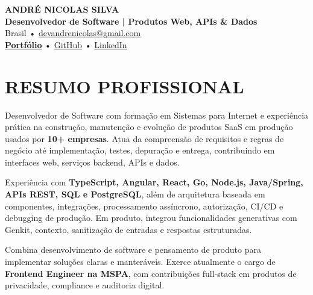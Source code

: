 \documentclass[10pt,a4paper]{article}
\begin{document}

\begin{center}

    {\LARGE \textbf{ANDRÉ NICOLAS SILVA}} \\[-2pt]

    {\normalsize \textbf{Desenvolvedor de Software | Produtos Web, APIs \& Dados}} \\[1pt]

    \footnotesize
    Brasil \quad • \quad
    \href{mailto:devandrenicolas@gmail.com}{devandrenicolas@gmail.com} \\[-1pt]

    \textbf{\href{https://portfolio-andrenicolas.vercel.app}{Portfólio}}
    \quad • \quad
    \href{https://github.com/devAndreNicolas}{GitHub}
    \quad • \quad
    \href{https://www.linkedin.com/in/devandrenicolas}{LinkedIn}

\end{center}

\vspace{-3pt}


\section*{RESUMO PROFISSIONAL}

\footnotesize

Desenvolvedor de Software com formação em Sistemas para Internet e experiência prática na construção, manutenção e evolução de produtos SaaS em produção usados por \textbf{10+ empresas}. Atua da compreensão de requisitos e regras de negócio até implementação, testes, depuração e entrega, contribuindo em interfaces web, serviços backend, APIs e dados.

Experiência com \textbf{TypeScript, Angular, React, Go, Node.js, Java/Spring, APIs REST, SQL e PostgreSQL}, além de arquitetura baseada em componentes, integrações, processamento assíncrono, autorização, CI/CD e debugging de produção. Em produto, integrou funcionalidades generativas com Genkit, contexto, sanitização de entradas e respostas estruturadas.

Combina desenvolvimento de software e pensamento de produto para implementar soluções claras e manteráveis. Exerce atualmente o cargo de \textbf{Frontend Engineer na MSPA}, com contribuições full-stack em produtos de privacidade, compliance e auditoria digital.
\end{document}
